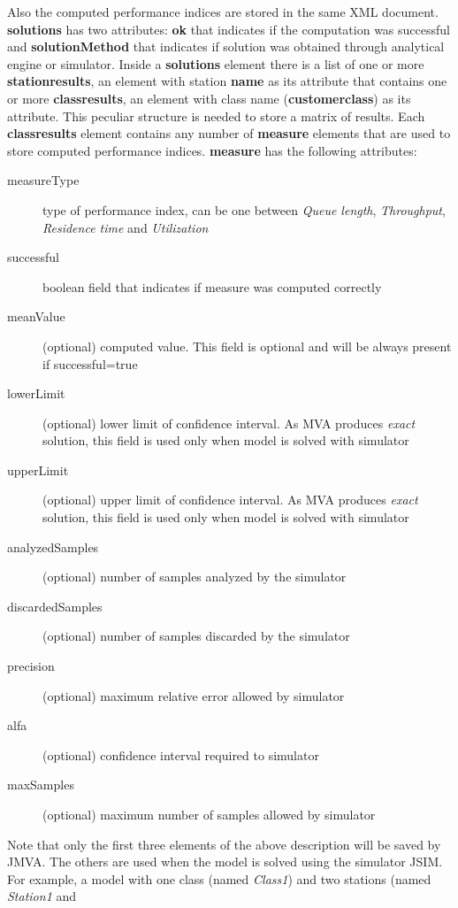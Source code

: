 Also the computed performance indices are stored in the same XML
document. \textbf{solutions} has two attributes: \textbf{ok} that
indicates if the computation was successful and
\textbf{solutionMethod} that indicates if solution was obtained
through analytical engine or simulator. Inside a \textbf{solutions}
element there is a list of one or more \textbf{stationresults}, an
element with station \textbf{name} as its attribute that contains
one or more \textbf{classresults}, an element with class name
(\textbf{customerclass}) as its attribute. This peculiar structure
is needed to store a matrix of results. Each \textbf{classresults}
element contains any number of \textbf{measure} elements that are
used to store computed performance indices. \textbf{measure} has the
following attributes:
\begin{description}
\item[measureType] type of performance index, can be one between \emph{Queue
length}, \emph{Throughput}, \emph{Residence time} and
\emph{Utilization}
\item[successful] boolean field that indicates if measure was
computed correctly
\item[meanValue] (optional) computed value. This field is optional
and will be always present if successful=true
\item[lowerLimit] (optional) lower limit of confidence interval. As
MVA produces \emph{exact} solution, this field is used only when
model is solved with simulator
\item[upperLimit] (optional) upper limit of confidence interval. As
MVA produces \emph{exact} solution, this field is used only when
model is solved with simulator
\item[analyzedSamples] (optional) number of samples analyzed by the
simulator
\item[discardedSamples] (optional) number of samples discarded by the
simulator
\item[precision] (optional) maximum relative error allowed by
simulator
\item[alfa] (optional) confidence interval required to simulator
\item[maxSamples] (optional) maximum number of samples allowed by
simulator
\end{description}
Note that only the first three elements of the above description
will be saved by JMVA. The others are used when the model is solved
using the simulator JSIM. For example, a model with one class (named
\emph{Class1}) and two stations (named \emph{Station1} and
